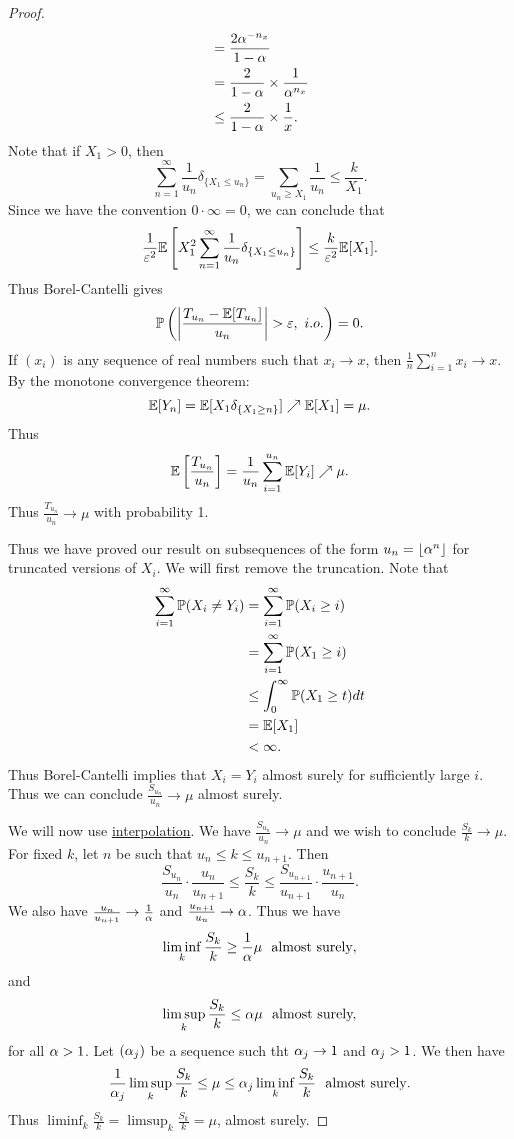 \begin{proof}
\begin{align*}
        &= \frac{2{\alpha}^{-n_x}}{1-{\alpha}}\\
        &= \frac{2}{1-{\alpha}} \times \frac{1}{{\alpha}^{n_x}}\\
        &\le \frac{2}{1-{\alpha}}\times \frac{1}{x}. 
    \end{align*}
    Note that if $X_1 > 0$, then 
    \[\sum_{n=1}^\infty \frac{1}{u_n} \delta_{\{X_1 \le u_n\}} = \sum_{u_n \ge X_1} \frac{1}{u_n} \le \frac{k}{X_1}. \]
    Since we have the convention $0 \cdot \infty = 0$, we can conclude that 
    \[\frac{1}{\varepsilon^2} {\mathbb{E}}\left[X_1^2 \sum_{n=1}^\infty \frac{1}{u_n}\delta_{\{X_1\le u_n \}}\right] \le \frac{k}{\varepsilon^2}{\mathbb{E}}[X_1]. \]
    Thus Borel-Cantelli gives 
    \[{\mathbb{P}}\left({\left\lvert\frac{T_{u_n} -{\mathbb{E}}[T_{u_n}]}{u_n}\right\rvert} > \varepsilon,~ i.o.\right) =0. \]
    If $(x_i)$ is any sequence of real numbers such that $x_i \to x$, then $\frac{1}{n}\sum_{i=1}^n x_i \to x$. By the monotone convergence theorem: 
    \[{\mathbb{E}}[Y_n] = {\mathbb{E}}[X_1\delta_{\{X_1 \ge n\}}] \nearrow {\mathbb{E}}[X_1] =\mu. \]
    Thus 
    \[{\mathbb{E}}\left[\frac{T_{u_n}}{u_n}\right] =\frac{1}{u_n}\sum_{i=1}^{u_n}{\mathbb{E}}[Y_i] \nearrow \mu. \]
    Thus $\frac{T_{u_n}}{u_n} \to \mu$ with probability 1.

    Thus we have proved our result on subsequences of the form $u_n = \lfloor {\alpha}^n \rfloor$ for truncated versions of $X_i$. We will first remove the truncation. Note that
    \begin{align*}
        \sum_{i=1}^\infty {\mathbb{P}}(X_i \neq Y_i) &= \sum_{i=1}^\infty {\mathbb{P}}(X_i \ge i)\\
        &= \sum_{i=1}^\infty {\mathbb{P}}(X_1 \ge i)\\
        &\le \int_0^\infty {\mathbb{P}}(X_1 \ge t)dt\\
        &={\mathbb{E}}[X_1]\\
        &< \infty.
    \end{align*}
    Thus Borel-Cantelli implies that $X_i = Y_i$ almost surely for sufficiently large $i$. Thus we can conclude $\frac{S_{u_n}}{u_n} \to \mu$ almost surely.

    We will now use \underline{interpolation}. We have $\frac{S_{u_n}}{u_n} \to \mu$ and we wish to conclude $\frac{S_k}{k} \to \mu$. For fixed $k$, let $n$ be such that $u_n \le k \le u_{n+1}$. Then 
    \[\frac{S_{u_n}}{u_n}\cdot \frac{u_n}{u_{n+1}} \le \frac{S_k}{k} \le \frac{S_{u_{n+1}}}{u_{n+1}}\cdot \frac{u_{n+1}}{u_n}. \]
    We also have $\frac{u_n}{u_{n+1}} \to \frac{1}{{\alpha}}$ and $\frac{u_{n+1}}{u_n} \to {\alpha}$. Thus we have 
    \[\liminf_k \frac{S_k}{k} \ge \frac{1}{{\alpha}} \mu ~\text{ almost surely}, \]
    and 
    \[\limsup_k \frac{S_k}{k} \le {\alpha} \mu ~\text{ almost surely,} \]
    for all ${\alpha} > 1$. Let $({\alpha}_j)$ be a sequence such tht ${\alpha}_j \to 1$ and ${\alpha}_j > 1$. We then have 
    \[\frac{1}{{\alpha}_j}\limsup_k \frac{S_k}{k} \le \mu \le {\alpha}_j \liminf_k \frac{S_k}{k} ~\text{ almost surely}. \]
    Thus $\liminf_k \frac{S_k}{k} = \limsup_k \frac{S_k}{k} = \mu$, almost surely.
\end{proof}
